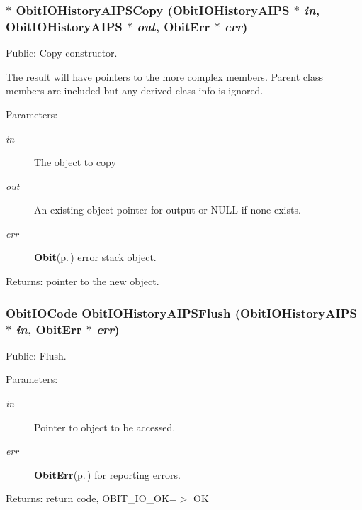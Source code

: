 \subsubsection{$\ast$ Obit\-IOHistory\-AIPSCopy ({\bf Obit\-IOHistory\-AIPS} $\ast$ {\em in}, {\bf Obit\-IOHistory\-AIPS} $\ast$ {\em out}, {\bf Obit\-Err} $\ast$ {\em err})}\label{ObitIOHistoryAIPS_8c_a14}


Public: Copy constructor. 

The result will have pointers to the more complex members. Parent class members are included but any derived class info is ignored. \begin{Desc}
\item[Parameters:]
\begin{description}
\item[{\em in}]The object to copy \item[{\em out}]An existing object pointer for output or NULL if none exists. \item[{\em err}]{\bf Obit}{\rm (p.\,\pageref{structObit})} error stack object. \end{description}
\end{Desc}
\begin{Desc}
\item[Returns:]pointer to the new object. \end{Desc}
\subsubsection{\setlength{\rightskip}{0pt plus 5cm}Obit\-IOCode Obit\-IOHistory\-AIPSFlush ({\bf Obit\-IOHistory\-AIPS} $\ast$ {\em in}, {\bf Obit\-Err} $\ast$ {\em err})}\label{ObitIOHistoryAIPS_8c_a23}


Public: Flush. 

\begin{Desc}
\item[Parameters:]
\begin{description}
\item[{\em in}]Pointer to object to be accessed. \item[{\em err}]{\bf Obit\-Err}{\rm (p.\,\pageref{structObitErr})} for reporting errors. \end{description}
\end{Desc}
\begin{Desc}
\item[Returns:]return code, OBIT\_\-IO\_\-OK=$>$ OK \end{Desc}

